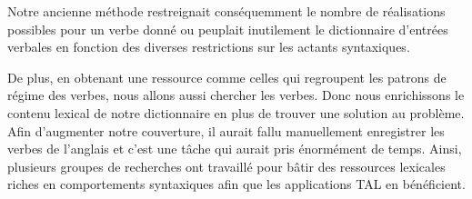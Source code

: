 Notre ancienne méthode restreignait conséquemment le nombre de réalisations possibles pour un verbe donné ou peuplait inutilement le dictionnaire d'entrées verbales en fonction des diverses restrictions sur les actants syntaxiques.

De plus, en obtenant une ressource comme celles qui regroupent les patrons de régime des verbes, nous allons aussi chercher les verbes. Donc nous enrichissons le contenu lexical de notre dictionnaire en plus de trouver une solution au problème. Afin d'augmenter notre couverture, il aurait fallu manuellement enregistrer les verbes de l'anglais et c'est une tâche qui aurait pris énormément de temps. Ainsi, plusieurs groupes de recherches ont travaillé pour bâtir des ressources lexicales riches en comportements syntaxiques afin que les applications \ac{TAL} en bénéficient.



